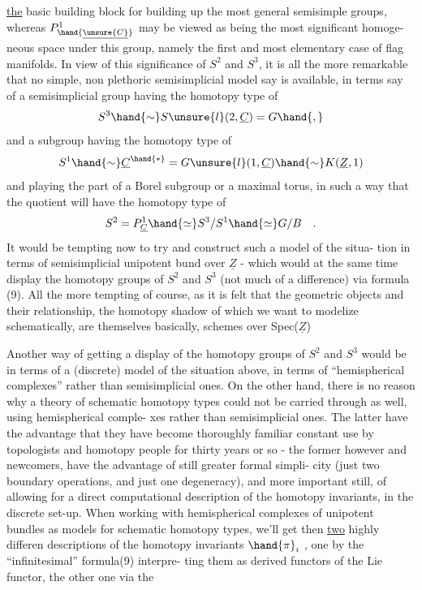 
\uline{the} basic building block for building up the most general semisimple
groups,  whereas $P^{1}_{\hand{\underline{\unsure{C}}}}$ may be viewed as being the most significant homoge-%
neous space under this group,  namely the first and most elementary case
of flag manifolds.  In view of this significance of $S^2$ and $S^3$,  it is all
the more remarkable that no simple, non plethoric semisimplicial model
say is available,  in terms say of a semisimplicial group having the
homotopy type of 
\[ S^3 \hand{\sim} S\unsure{l}(2,\underline{C} )= G \hand{,} \]
and a subgroup having the homotopy type of
\[ S^1 \hand{\sim} \underline{C}^{\hand{*}} = G\unsure{l}(1,\underline{C}) \hand{\sim} K(\underline{Z},1) \]
and playing the part of a Borel subgroup or a maximal torus,  in such a
way that the quotient will have the homotopy type of
\[ S^2 = P^1_{\underline{C}} \hand{\simeq} S^3/S^1 \hand{\simeq} G/B \quad . \]
It would be tempting now to try and construct such a model of the situa-%
tion in terms of semisimplicial unipotent bund over $\underline{Z}$  - which would
at the same time display the homotopy groups of $S^2$ and $S^3$ (not much of a
difference\hand{!}) via formula (9).  All the more tempting of course,  as it is
felt that the geometric objects and their relationship,  the homotopy
shadow of which we want to modelize  schematically,  are themselves
basically,  schemes over Spec($\underline{Z}$)\hand{!}

\margin{!\ \rule{0.4pt}{3\baselineskip}}Another way of getting a display of the homotopy groups of $S^2$ and
$S^3$ would be in terms of a (discrete) model of the situation above,  in
terms of ``hemispherical complexes'' rather than semisimplicial ones.  On
the other hand,  there is no reason why a theory of schematic homotopy
types could not be carried through as well,  using hemispherical comple-%
xes rather than semisimplicial ones.  The latter  have the advantage 
that they have become   thoroughly familiar   constant use
by topologists and homotopy people for thirty years or so  -  the former
however and newcomers,  have the advantage of still greater formal simpli-%
city (just two boundary operations,  and just one degeneracy),  and more
important still,  of allowing for a direct computational description of
the homotopy invariants,  in the discrete set-up.  When working with
hemispherical complexes of unipotent bundles as models for schematic
homotopy types,  we'll get then \uline{two} highly differen descriptions of the
homotopy invariants $\hand{\pi}_i$ ,  one by the ``infinitesimal'' formula(9)  interpre-%
ting them as derived functors of the Lie functor,  the other one via the


